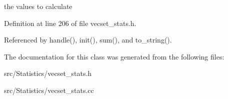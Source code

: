 the values to calculate 

Definition at line 206 of file vecset\_\-stats.h.

Referenced by handle(), init(), sum(), and to\_\-string().

The documentation for this class was generated from the following files:\begin{CompactItemize}
\item 
src/Statistics/vecset\_\-stats.h\item 
src/Statistics/vecset\_\-stats.cc\end{CompactItemize}

